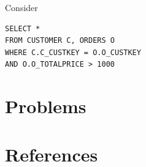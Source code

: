 \documentclass[11pt]{article}
\begin{document}
\begin{examplle}[]
Consider
\begin{verbatim}
SELECT *
FROM CUSTOMER C, ORDERS O
WHERE C.C_CUSTKEY = O.O_CUSTKEY
AND O.O_TOTALPRICE > 1000
\end{verbatim}
\end{examplle}
\section{Problems}
\label{sec:orge86dbea}


\section{References}
\label{sec:org236b051}
\label{bibliographystyle link}



\end{document}
